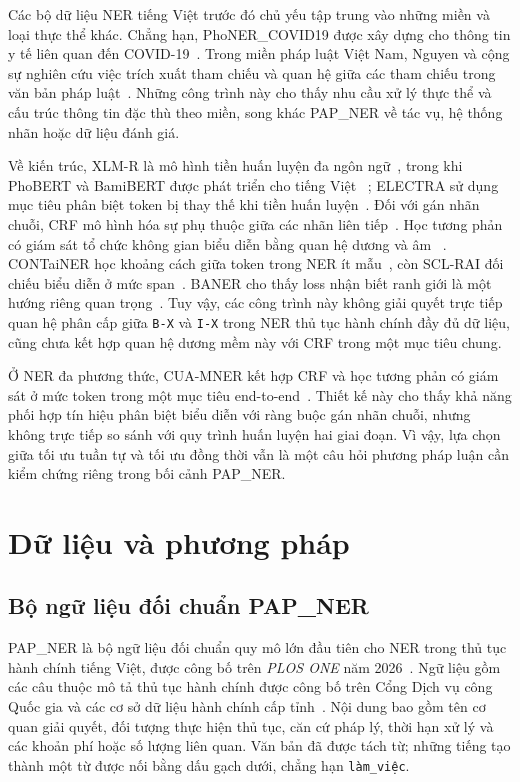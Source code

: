 \documentclass[conference,a4paper]{IEEEtran}
\begin{document}
Các bộ dữ liệu NER tiếng Việt trước đó chủ yếu tập trung vào những
miền và loại thực thể khác. Chẳng hạn, PhoNER\_COVID19 được xây dựng
cho thông tin y tế liên quan đến COVID-19~\cite{truong2021phonercovid19}. Trong miền pháp luật
Việt Nam, Nguyen và cộng sự nghiên cứu việc trích xuất tham chiếu
và quan hệ giữa các tham chiếu trong văn bản pháp luật~\cite{nguyen2023legalreferences}. Những
công trình này cho thấy nhu cầu xử lý thực thể và cấu trúc thông tin
đặc thù theo miền, song khác PAP\_NER về tác vụ, hệ thống nhãn hoặc
dữ liệu đánh giá.

Về kiến trúc, XLM-R là mô hình tiền huấn luyện đa ngôn ngữ~\cite{conneau2020xlmr},
trong khi PhoBERT và BamiBERT được phát triển cho tiếng Việt
~\cite{nguyen2020phobert,nguyen2026bamibert}; ELECTRA sử dụng mục tiêu phân biệt token bị thay thế khi
tiền huấn luyện~\cite{clark2020electra}. Đối với gán nhãn chuỗi, CRF mô hình hóa sự phụ
thuộc giữa các nhãn liên tiếp~\cite{lafferty2001crf}. Học tương phản có
giám sát tổ chức không gian biểu diễn bằng quan hệ dương và âm
~\cite{khosla2020supcon}. CONTaiNER học khoảng cách giữa token trong NER
ít mẫu~\cite{das2022container}, còn SCL-RAI đối chiếu biểu diễn ở mức
span~\cite{si2022sclrai}. BANER cho thấy loss nhận biết ranh giới là một
hướng riêng quan trọng~\cite{guo2025baner}. Tuy vậy, các công trình này
không giải quyết trực tiếp quan hệ phân cấp giữa \texttt{B-X} và
\texttt{I-X} trong NER thủ tục hành chính đầy đủ dữ liệu, cũng chưa kết
hợp quan hệ dương mềm này với CRF trong một mục tiêu chung.

Ở NER đa phương thức, CUA-MNER kết hợp CRF và học tương phản có giám sát
ở mức token trong một mục tiêu end-to-end~\cite{yang2026cuamner}. Thiết kế
này cho thấy khả năng phối hợp tín hiệu phân biệt biểu diễn với ràng buộc
gán nhãn chuỗi, nhưng không trực tiếp so sánh với quy trình huấn luyện hai
giai đoạn. Vì vậy, lựa chọn giữa tối ưu tuần tự và tối ưu đồng thời vẫn là
một câu hỏi phương pháp luận cần kiểm chứng riêng trong bối cảnh PAP\_NER.

\section{Dữ liệu và phương pháp}\label{sec:method}

\subsection{Bộ ngữ liệu đối chuẩn PAP\_NER}\label{subsec:data}

PAP\_NER là bộ ngữ liệu đối chuẩn quy mô lớn đầu tiên cho NER trong thủ
tục hành chính tiếng Việt, được công bố trên \textit{PLOS ONE} năm
2026~\cite{la2026papner}. Ngữ liệu gồm các câu thuộc mô tả thủ tục
hành chính được công bố trên Cổng Dịch vụ công Quốc gia và các cơ sở
dữ liệu hành chính cấp tỉnh~\cite{la2026papner,la2025papnerdata}. Nội dung bao gồm tên cơ quan giải
quyết, đối tượng thực hiện thủ tục, căn cứ pháp lý, thời hạn xử lý và
các khoản phí hoặc số lượng liên quan. Văn bản đã được tách từ; những
tiếng tạo thành một từ được nối bằng dấu gạch dưới, chẳng hạn
\texttt{làm\_việc}.
\end{document}
